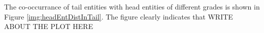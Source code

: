 The co-occurrance of tail entities with head entities of different grades is shown in 
Figure \ref{img:headEntDistInTail}. The figure clearly indicates that 
WRITE ABOUT THE PLOT HERE

 





